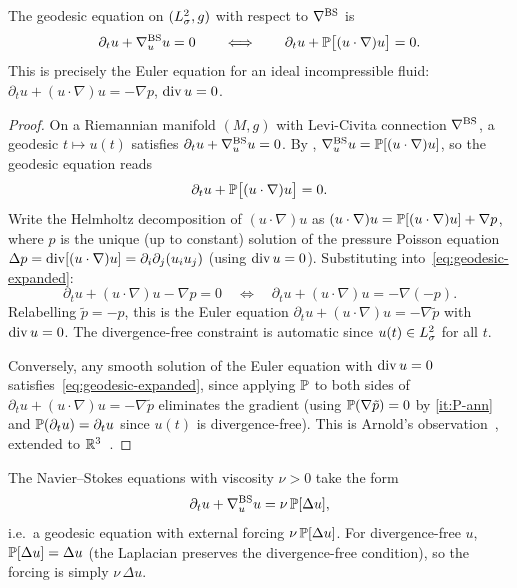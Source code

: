 \begin{theorem}[Geodesic equation = Euler equation]\label{thm:geodesic-euler}
  The geodesic equation on $(L^{2}_\sigma, g)$ with respect to $\nabla^{\mathrm{BS}}$ is
  \begin{equation}\label{eq:geodesic}
    \partial_t u + \nabla^{\mathrm{BS}}_u u = 0
    \qquad\Longleftrightarrow\qquad
    \partial_t u + \mathbb{P}\bigl[(u \cdot \nabla)u\bigr] = 0.
  \end{equation}
  This is precisely the Euler equation for an ideal incompressible fluid:
  $\partial_t u + (u \cdot \nabla)u = -\nabla p$, $\operatorname{div} u = 0$.
\end{theorem}

\begin{proof}
  On a Riemannian manifold $(M,g)$ with Levi-Civita connection $\nabla^{\mathrm{BS}}$,
  a geodesic $t \mapsto u(t)$ satisfies $\partial_t u + \nabla^{\mathrm{BS}}_u u = 0$.
  By ,
  $\nabla^{\mathrm{BS}}_u u = \mathbb{P}[(u\cdot\nabla)u]$,
  so the geodesic equation reads
  \begin{equation}\label{eq:geodesic-expanded}
    \partial_t u + \mathbb{P}\bigl[(u\cdot\nabla)u\bigr] = 0.
  \end{equation}
  Write the Helmholtz decomposition of $(u\cdot\nabla)u$ as
  $(u\cdot\nabla)u = \mathbb{P}[(u\cdot\nabla)u] + \nabla p$,
  where $p$ is the unique (up to constant) solution of the pressure Poisson equation
  $\Delta p = \operatorname{div}[(u\cdot\nabla)u] = \partial_i\partial_j(u_i u_j)$
  (using $\operatorname{div} u = 0$).  Substituting into~\eqref{eq:geodesic-expanded}:
  \[
    \partial_t u + (u\cdot\nabla)u - \nabla p = 0
    \quad\Longleftrightarrow\quad
    \partial_t u + (u\cdot\nabla)u = -\nabla(-p).
  \]
  Relabelling $\tilde{p} = -p$, this is the Euler equation
  $\partial_t u + (u\cdot\nabla)u = -\nabla\tilde{p}$ with $\operatorname{div} u = 0$.
  The divergence-free constraint is automatic since $u(t) \in L^{2}_\sigma$ for all $t$.

  Conversely, any smooth solution of the Euler equation with $\operatorname{div} u = 0$
  satisfies~\eqref{eq:geodesic-expanded}, since applying $\mathbb{P}$ to both sides of
  $\partial_t u + (u\cdot\nabla)u = -\nabla\tilde{p}$ eliminates the gradient
  (using $\mathbb{P}(\nabla\tilde{p}) = 0$ by
  \ref{it:P-ann} and $\mathbb{P}(\partial_t u) = \partial_t u$
  since $u(t)$ is divergence-free).  This is Arnold's
  observation~\cite{arnold1966}, extended to
  $\mathbb{R}^3$~\cite{ebinMarsden1970,arnoldKhesin1998}.
\end{proof}

\begin{corollary}\label{cor:ns-forced-geodesic}
  The Navier--Stokes equations with viscosity $\nu > 0$ take the form
  \begin{equation}\label{eq:ns-forced-geodesic}
    \partial_t u + \nabla^{\mathrm{BS}}_u u = \nu\,\mathbb{P}[\Delta u],
  \end{equation}
  i.e.\ a geodesic equation with external forcing $\nu\,\mathbb{P}[\Delta u]$.
  For divergence-free $u$, $\mathbb{P}[\Delta u] = \Delta u$ (the Laplacian preserves the
  divergence-free condition), so the forcing is simply $\nu\,\Delta u$.
\end{corollary}


